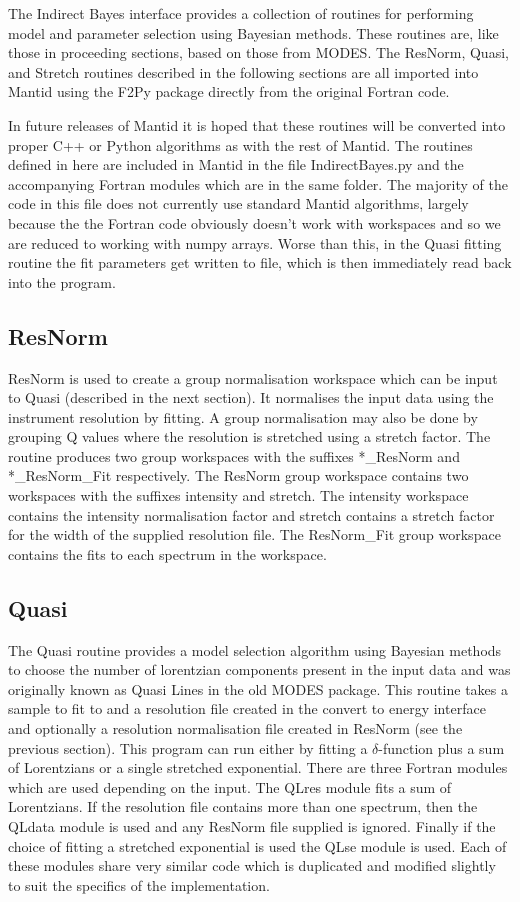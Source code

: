 \documentclass[paper=a4, fontsize=11pt]{scrartcl}	%
\numberwithin{equation}{section}															%
\numberwithin{figure}{section}																%
\numberwithin{table}{section}																%
\begin{document}
The Indirect Bayes interface provides a collection of routines for performing model and parameter selection using Bayesian methods. These routines are, like those in proceeding sections, based on those from MODES. The ResNorm, Quasi, and Stretch routines described in the following sections are all imported into Mantid using the F2Py package directly from the original Fortran code. 

In future releases of Mantid it is hoped that these routines will be converted into proper C++ or Python algorithms as with the rest of Mantid. The routines defined in here are included in Mantid in the file IndirectBayes.py and the accompanying Fortran modules which are in the same folder. The majority of the code in this file does not currently use standard Mantid algorithms, largely because the the Fortran code obviously doesn't work with workspaces and so we are reduced to working with numpy arrays. Worse than this, in the Quasi fitting routine the fit parameters get written to file, which is then immediately read back into the program.

\subsection{ResNorm}
ResNorm is used to create a group normalisation workspace which can be input to Quasi (described in the next section). It normalises the input data using the instrument resolution by fitting. A group normalisation may also be done by grouping Q values where the resolution is stretched using a stretch factor. The routine produces two group workspaces with the suffixes \**\_ResNorm and \**\_ResNorm\_Fit respectively. The ResNorm group workspace contains two workspaces with the suffixes intensity and stretch. The intensity workspace contains the intensity normalisation factor and stretch contains a stretch factor for the width of the supplied resolution file. The ResNorm\_Fit group workspace contains the fits to each spectrum in the workspace.

\subsection{Quasi}
The Quasi routine provides a model selection algorithm using Bayesian methods to choose the number of lorentzian components present in the input data \cite{dssivia1992} and was originally known as Quasi Lines in the old MODES package. This routine takes a sample to fit to and a resolution file created in the convert to energy interface and optionally a resolution normalisation file created in ResNorm (see the previous section). This program can run either by fitting a $\delta$-function plus a sum of Lorentzians or a single stretched exponential. There are three Fortran modules which are used depending on the input. The QLres module fits a sum of Lorentzians. If the resolution file contains more than one spectrum, then the QLdata module is used and any ResNorm file supplied is ignored. Finally if the choice of fitting a stretched exponential is used the QLse module is used. Each of these modules share very similar code which is duplicated and modified slightly to suit the specifics of the implementation.
\end{document}
